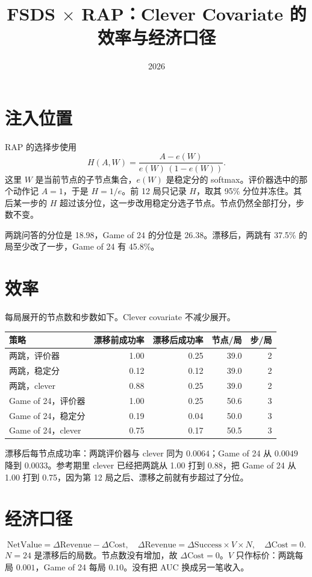 \documentclass[UTF8,a4paper]{ctexart}
\title{FSDS $\times$ RAP：Clever Covariate 的效率与经济口径}
\author{}
\date{2026}
\begin{document}
\maketitle

\section{注入位置}
RAP 的选择步使用
\[
H(A,W)=\frac{A-e(W)}{e(W)\,(1-e(W))}.
\]
这里 \(W\) 是当前节点的子节点集合，\(e(W)\) 是稳定分的 softmax。评价器选中的那个动作记 \(A=1\)，于是 \(H=1/e\)。前 12 局只记录 \(H\)，取其 95\% 分位并冻住。其后某一步的 \(H\) 超过该分位，这一步改用稳定分选子节点。节点仍然全部打分，步数不变。

两跳问答的分位是 18.98，Game of 24 的分位是 26.38。漂移后，两跳有 37.5\% 的局至少改了一步，Game of 24 有 45.8\%。

\section{效率}
每局展开的节点数和步数如下。Clever covariate 不减少展开。

\begin{center}
\begin{tabular}{lrrrr}
\toprule
策略 & 漂移前成功率 & 漂移后成功率 & 节点/局 & 步/局 \\
\midrule
两跳，评价器 & 1.00 & 0.25 & 39.0 & 2 \\
两跳，稳定分 & 0.12 & 0.12 & 39.0 & 2 \\
两跳，clever & 0.88 & 0.25 & 39.0 & 2 \\
Game of 24，评价器 & 1.00 & 0.25 & 50.6 & 3 \\
Game of 24，稳定分 & 0.19 & 0.04 & 50.0 & 3 \\
Game of 24，clever & 0.75 & 0.17 & 50.5 & 3 \\
\bottomrule
\end{tabular}
\end{center}

漂移后每节点成功率：两跳评价器与 clever 同为 \(0.0064\)；Game of 24 从 \(0.0049\) 降到 \(0.0033\)。参考期里 clever 已经把两跳从 1.00 打到 0.88，把 Game of 24 从 1.00 打到 0.75，因为第 12 局之后、漂移之前就有步超过了分位。

\section{经济口径}
\[
\mathrm{NetValue}=\Delta\mathrm{Revenue}-\Delta\mathrm{Cost},
\quad
\Delta\mathrm{Revenue}=\Delta\mathrm{Success}\times V\times N,
\quad
\Delta\mathrm{Cost}=0.
\]
\(N=24\) 是漂移后的局数。节点数没有增加，故 \(\Delta\mathrm{Cost}=0\)。\(V\) 只作标价：两跳每局 \(0.001\)，Game of 24 每局 \(0.10\)。没有把 AUC 换成另一笔收入。
\end{document}
